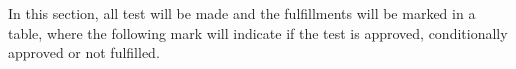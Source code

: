 In this section, all test will be made and the fulfillments will be marked in a table, where the following mark will indicate if the test is approved, conditionally approved or not fulfilled.
 
    \startexplain
    \stopexplain